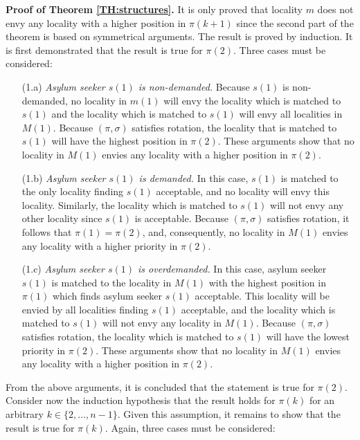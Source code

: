 \documentclass[12pt,fleqn]{article}
\begin{document}
\medskip

\noindent\textbf{Proof of Theorem \ref{TH:structures}.} It is only proved that locality $m$ does not envy any locality with a higher position in $\pi(k+1)$ since the second part of the theorem is based on symmetrical arguments. The result is proved by induction. It is first demonstrated that the result is true for $\pi(2)$. Three cases must be considered:

\begin{itemize}

\item[(1.a)] \emph{Asylum seeker $s(1)$ is non-demanded.} Because $s(1)$ is non-demanded, no locality in $m(1)$ will envy the locality which is matched to $s(1)$ and the locality which is matched to $s(1)$ will envy all localities in $M(1)$. Because $(\pi,\sigma)$ satisfies rotation, the locality that is matched to $s(1)$ will have the highest position in $\pi(2)$. These arguments show that no locality in $M(1)$ envies any locality with a higher position in $\pi(2)$.

\item[(1.b)] \emph{Asylum seeker $s(1)$ is demanded.} In this case, $s(1)$ is matched to the only locality finding $s(1)$ acceptable, and no locality will envy this locality. Similarly, the locality which is matched to $s(1)$ will not envy any other locality since $s(1)$ is acceptable. Because $(\pi,\sigma)$ satisfies rotation, it follows that $\pi(1)=\pi(2)$, and, consequently, no locality in $M(1)$ envies any locality with a higher priority in $\pi(2)$.

\item[(1.c)] \emph{Asylum seeker $s(1)$ is overdemanded.} In this case, asylum seeker $s(1)$ is matched to the locality in $M(1)$ with the highest position in $\pi(1)$ which finds asylum seeker $s(1)$ acceptable. This locality will be envied by all localities finding $s(1)$ acceptable, and the locality which is matched to $s(1)$ will not envy any locality in $M(1)$. Because $(\pi,\sigma)$ satisfies rotation, the locality which is matched to $s(1)$ will have the lowest priority in $\pi(2)$. These arguments show that no locality in $M(1)$ envies any locality with a higher position in $\pi(2)$.
\end{itemize}

\noindent From the above arguments, it is concluded that the statement is true for $\pi(2)$. Consider now the induction hypothesis that the result holds for $\pi(k)$ for an arbitrary $k\in \{2,\ldots,n-1\}$. Given this assumption, it remains to show that the result is true for $\pi(k)$. Again, three cases must be considered:
\end{document}
